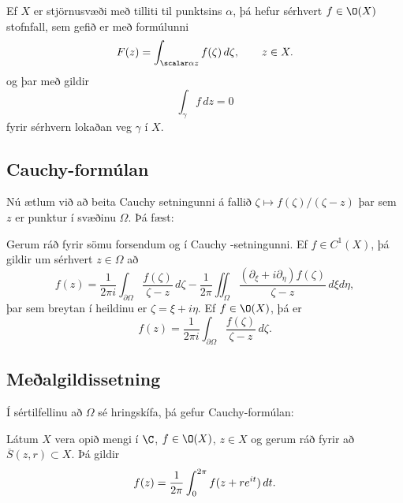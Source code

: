 
\begin{se} \label{se:10.2.3}
Ef $X$ er stjörnusvæði með tilliti til punktsins $\alpha$, 
þá hefur sérhvert $f\in \O(X)$ stofnfall, sem
gefið er með formúlunni
\begin{equation*}\label{10.2.4a}
F(z)=\int_{\scalar \alpha z} f(\zeta)\, d\zeta, \qquad z\in X.
\end{equation*}
og
þar með gildir 
\begin{equation*}\int_\gamma f\, dz =0
\label{10.2.4}
 \end{equation*}
fyrir sérhvern lokaðan veg $\gamma$ í $X$.
\end{se}

\subsection*{Cauchy-formúlan}


Nú ætlum við að beita Cauchy setningunni á fallið 
$\zeta\mapsto f(\zeta)/(\zeta-z)$ þar sem $z$ er punktur í
svæðinu $\Omega$.  Þá fæst:

\begin{se}
Gerum ráð fyrir sömu forsendum og í Cauchy -setn\-ing\-unni.  Ef
$f\in C^1(X)$, þá gildir um sérhvert $z\in \Omega$ að
\begin{equation*}
f(z)=\dfrac 1{2 \pi i}\int_{\partial\Omega}\dfrac
{f(\zeta)}{\zeta-z}\, d\zeta -\dfrac 1{2\pi}\iint_{\Omega}
\dfrac{(\partial_\xi+i\partial_\eta)f(\zeta)}
{\zeta-z}\, d\xi d\eta, \label{10.2.5}
\end{equation*}
þar sem breytan í heildinu er ${\zeta}={\xi}+i\eta$.
Ef $f\in \O(X)$, þá er 
\begin{equation*}
f(z)=\dfrac 1{2 \pi i}\int_{\partial\Omega}\dfrac
{f(\zeta)}{\zeta-z}\, d\zeta.\label{10.2.6}
\end{equation*}
\end{se}


\subsection*{Meðalgildissetning}

Í sértilfellinu að $\Omega$ sé hringskífa, þá gefur Cauchy-formúlan:

\begin{se}  
Látum $X$ vera opið mengi í $\C$, $f\in
\O(X)$,  $z\in X$
og gerum ráð fyrir að $\overline S(z,r)\subset X$.  
Þá  gildir
 $$f(z)=\dfrac 1{2\pi} \int_0\sp{2\pi}f(z+re\sp{it})\, dt.
 $$
\end{se}


